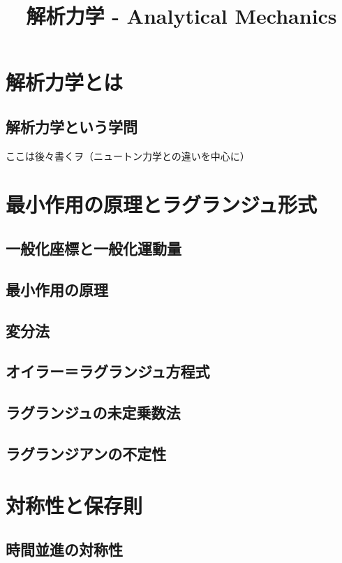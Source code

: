 \documentclass[a4paper]{jsreport}
\title{解析力学 - Analytical Mechanics}
\begin{document}
    \maketitle

    \tableofcontents

    \chapter{解析力学とは}
        \section{解析力学という学問}
            ここは後々書くヲ（ニュートン力学との違いを中心に）
            

    \chapter{最小作用の原理とラグランジュ形式}
        \section{一般化座標と一般化運動量}
        \section{最小作用の原理}
        \section{変分法}
        \section{オイラー＝ラグランジュ方程式}
        \section{ラグランジュの未定乗数法}
        \section{ラグランジアンの不定性}

    \chapter{対称性と保存則}
        \section{時間並進の対称性}
\end{document}
